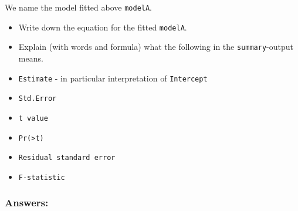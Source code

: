 \documentclass[]{article}
\providecommand{\tightlist}{%
  \setlength{\itemsep}{0pt}\setlength{\parskip}{0pt}}
\begin{document}
We name the model fitted above \texttt{modelA}.

\begin{itemize}
\tightlist
\item
  Write down the equation for the fitted \texttt{modelA}.
\item
  Explain (with words and formula) what the following in the
  \texttt{summary}-output means.
\item
  \texttt{Estimate} - in particular interpretation of \texttt{Intercept}
\item
  \texttt{Std.Error}
\item
  \texttt{t\ value}
\item
  \texttt{Pr(\textgreater{}\textbar{}t\textbar{})}
\item
  \texttt{Residual\ standard\ error}
\item
  \texttt{F-statistic}
\end{itemize}

\subsubsection{Answers:}\label{answers}
\end{document}

